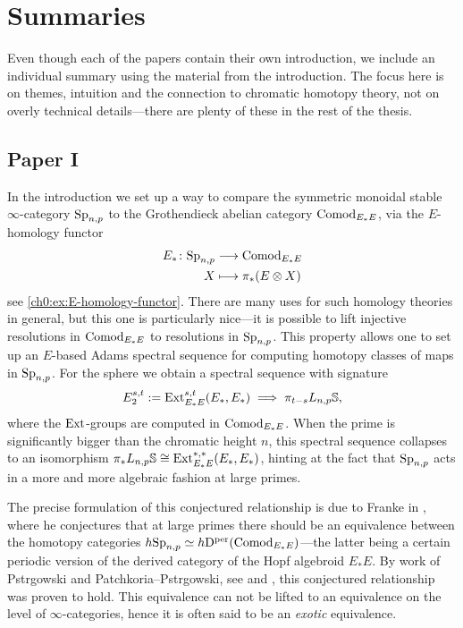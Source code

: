 \section{Summaries}

Even though each of the papers contain their own introduction, we include an individual summary using the material from the introduction. The focus here is on themes, intuition and the connection to chromatic homotopy theory, not on overly technical details---there are plenty of these in the rest of the thesis. 

\subsection{Paper I}

In the introduction we set up a way to compare the symmetric monoidal stable $\infty$-category $\mathrm{Sp}_{n,p}$ to the Grothendieck abelian category $\mathrm{Comod}_{E_*E}$, via the $E$-homology functor
\begin{align*}
    E_*\colon \mathrm{Sp}_{n,p} &\longrightarrow \mathrm{Comod}_{E_*E} \\
    X &\longmapsto \pi_*(E\otimes X)
\end{align*}
see \cref{ch0:ex:E-homology-functor}. There are many uses for such homology theories in general, but this one is particularly nice---it is possible to lift injective resolutions in $\mathrm{Comod}_{E_*E}$ to resolutions in $\mathrm{Sp}_{n,p}$. This property allows one to set up an $E$-based Adams spectral sequence for computing homotopy classes of maps in $\mathrm{Sp}_{n,p}$. For the sphere we obtain a spectral sequence with signature 
\[E_2^{s,t} := \operatorname{Ext}^{s,t}_{E_*E}(E_*, E_*) \implies \pi_{t-s}L_{n,p} \mathbb{S},\]
where the $\operatorname{Ext}$-groups are computed in $\mathrm{Comod}_{E_*E}$. When the prime is significantly bigger than the chromatic height $n$, this spectral sequence collapses to an isomorphism $\pi_* L_{n,p} \mathbb{S} \cong \operatorname{Ext}_{E_*E}^{*,*}(E_*, E_*)$, hinting at the fact that $\mathrm{Sp}_{n,p}$ acts in a more and more algebraic fashion at large primes. 

The precise formulation of this conjectured relationship is due to Franke in \cite{franke_96}, where he conjectures that at large primes there should be an equivalence between the homotopy categories $h\mathrm{Sp}_{n,p} \simeq h\mathrm{D}^{\mathrm{per}}(\mathrm{Comod}_{E_*E})$---the latter being a certain periodic version of the derived category of the Hopf algebroid $E_*E$. By work of Pstr\a{}gowski and Patchkoria--Pstr\a{}gowski, see \cite{pstragowski_2021} and \cite{patchkoria-pstragowski_2021}, this conjectured relationship was proven to hold. This equivalence can not be lifted to an equivalence on the level of $\infty$-categories, hence it is often said to be an \emph{exotic} equivalence. 

